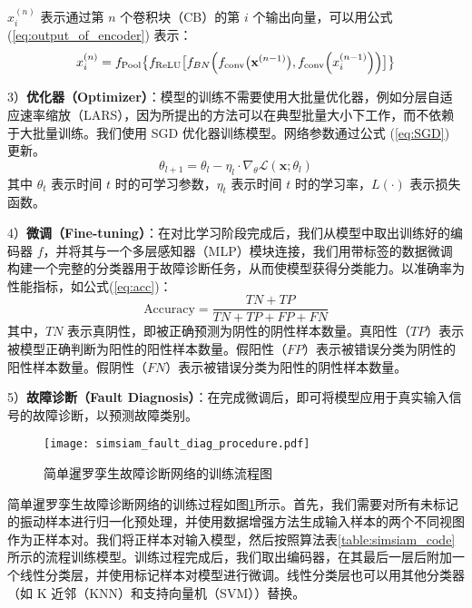 \documentclass[master]{thesis-uestc}
\begin{document}
\( x_i^{(n)} \) 表示通过第 \( n \) 个卷积块（CB）的第 \( i \) 个输出向量，可以用公式 (\ref{eq:output_of_encoder}) 表示：
\begin{equation}
    \begin{aligned}
    x_i^{(n)} = f_{\text{Pool}}\bigl\{f_{\text{ReLU}}\bigl[f_{BN}\Bigl(f_{\text{conv}}\bigl(\mathbf{x}^{(n-1)}\bigr), f_{\text{conv}}\Bigl(x_i^{(n-1)}\Bigr)\Bigr)\bigr]\bigr\}
    \end{aligned}
    \label{eq:output_of_encoder}
\end{equation}

3）\textbf{优化器（Optimizer）}：模型的训练不需要使用大批量优化器，例如分层自适应速率缩放（LARS），因为所提出的方法可以在典型批量大小下工作，而不依赖于大批量训练。我们使用 SGD 优化器训练模型。网络参数通过公式 (\ref{eq:SGD}) 更新。
\begin{equation}
    \theta_{l+1} = \theta_l - \eta_l \cdot \nabla_{\theta} \mathcal{L}(\mathbf{x}; \theta_l)
\label{eq:SGD}
\end{equation}
其中 \( \theta_t \) 表示时间 \( t \) 时的可学习参数，\( \eta_t \) 表示时间 \( t \) 时的学习率，\( L(\cdot) \) 表示损失函数。

4）\textbf{微调（Fine-tuning）}：在对比学习阶段完成后，我们从模型中取出训练好的编码器 \( f \)，并将其与一个多层感知器（MLP）模块连接，我们用带标签的数据微调构建一个完整的分类器用于故障诊断任务，从而使模型获得分类能力。以准确率为性能指标，如公式(\ref{eq:acc})：
\begin{equation}
    \text{Accuracy} = \frac{TN + TP}{TN + TP + FP + FN}
    \label{eq:acc}
\end{equation}
其中，\( TN \) 表示真阴性，即被正确预测为阴性的阴性样本数量。真阳性（\( TP \)）表示被模型正确判断为阳性的阳性样本数量。假阳性（\( FP \)）表示被错误分类为阴性的阳性样本数量。假阴性（\( FN \)）表示被错误分类为阳性的阴性样本数量。

5）\textbf{故障诊断（Fault Diagnosis）}：在完成微调后，即可将模型应用于真实输入信号的故障诊断，以预测故障类别。
\begin{figure}[h]
    \centering
    \texttt{[image: simsiam\_fault\_diag\_procedure.pdf]}
    \caption{简单暹罗孪生故障诊断网络的训练流程图}
    \label{simsiam_fault_diag_procedure}
\end{figure}
简单暹罗孪生故障诊断网络的训练过程如图\ref{simsiam_fault_diag_procedure}所示。首先，我们需要对所有未标记的振动样本进行归一化预处理，并使用数据增强方法生成输入样本的两个不同视图作为正样本对。我们将正样本对输入模型，然后按照算法表\ref{table:simsiam_code}所示的流程训练模型。训练过程完成后，我们取出编码器，在其最后一层后附加一个线性分类层，并使用标记样本对模型进行微调。线性分类层也可以用其他分类器（如 K 近邻（KNN）和支持向量机（SVM））替换。
\end{document}
